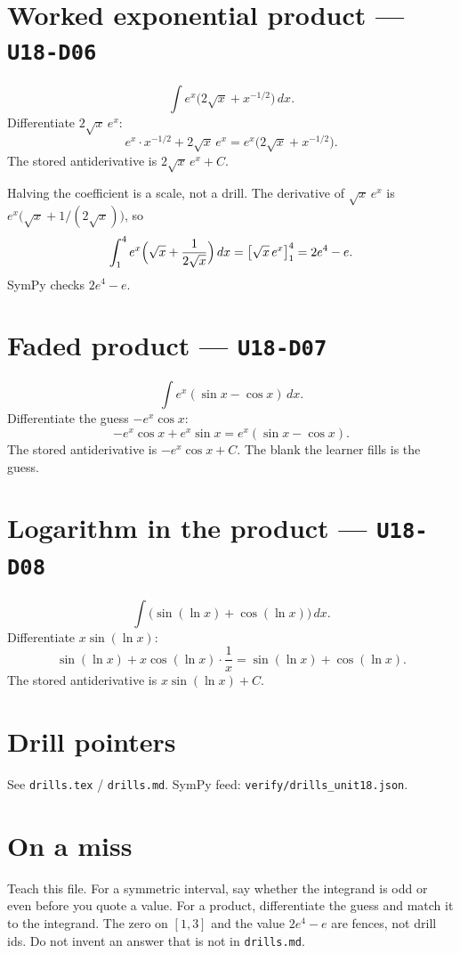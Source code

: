 \section{Worked exponential product --- \texttt{U18-D06}}
\[
\int e^{x}\bigl(2\sqrt{x}+x^{-1/2}\bigr)\,dx.
\]
Differentiate $2\sqrt{x}\,e^{x}$:
\[
e^{x}\cdot x^{-1/2}+2\sqrt{x}\,e^{x}=e^{x}\bigl(2\sqrt{x}+x^{-1/2}\bigr).
\]
The stored antiderivative is $2\sqrt{x}\,e^{x}+C$.

Halving the coefficient is a scale, not a drill. The derivative of $\sqrt{x}\,e^{x}$ is $e^{x}\bigl(\sqrt{x}+1/(2\sqrt{x})\bigr)$, so
\[
\int_{1}^{4}e^{x}\Bigl(\sqrt{x}+\frac{1}{2\sqrt{x}}\Bigr)\,dx=\bigl[\sqrt{x}\,e^{x}\bigr]_{1}^{4}=2e^{4}-e.
\]
SymPy checks $2e^{4}-e$.

\section{Faded product --- \texttt{U18-D07}}
\[
\int e^{x}(\sin x-\cos x)\,dx.
\]
Differentiate the guess $-e^{x}\cos x$:
\[
-e^{x}\cos x+e^{x}\sin x=e^{x}(\sin x-\cos x).
\]
The stored antiderivative is $-e^{x}\cos x+C$. The blank the learner fills is the guess.

\section{Logarithm in the product --- \texttt{U18-D08}}
\[
\int\bigl(\sin(\ln x)+\cos(\ln x)\bigr)\,dx.
\]
Differentiate $x\sin(\ln x)$:
\[
\sin(\ln x)+x\cos(\ln x)\cdot\frac1x=\sin(\ln x)+\cos(\ln x).
\]
The stored antiderivative is $x\sin(\ln x)+C$.

\section{Drill pointers}
See \texttt{drills.tex} / \texttt{drills.md}. SymPy feed: \texttt{verify/drills\_unit18.json}.

\section*{On a miss}
Teach this file. For a symmetric interval, say whether the integrand is odd or even before you quote a value. For a product, differentiate the guess and match it to the integrand. The zero on $[1,3]$ and the value $2e^{4}-e$ are fences, not drill ids. Do not invent an answer that is not in \texttt{drills.md}.


